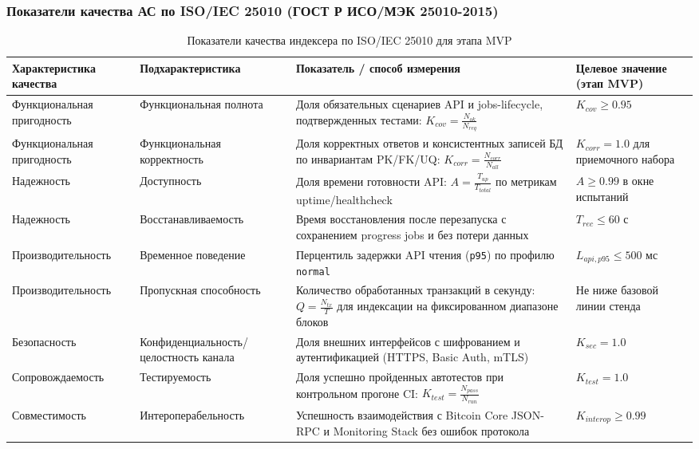 ﻿\documentclass[14pt,a4paper]{extarticle}
\begin{document}
\subsubsection{Показатели качества АС по ISO/IEC 25010 (ГОСТ Р ИСО/МЭК 25010-2015)}
\begin{table}[H]
\centering
\begin{tabular}{p{} p{} p{} p{}}
\toprule
Характеристика качества & Подхарактеристика & Показатель / способ измерения & Целевое значение (этап MVP) \\
\midrule
Функциональная пригодность & Функциональная полнота & Доля обязательных сценариев API и jobs-lifecycle, подтвержденных тестами: $K_{cov}=\frac{N_{ok}}{N_{req}}$ & $K_{cov} \ge 0.95$ \\
\midrule
Функциональная пригодность & Функциональная корректность & Доля корректных ответов и консистентных записей БД по инвариантам PK/FK/UQ: $K_{corr}=\frac{N_{corr}}{N_{all}}$ & $K_{corr}=1.0$ для приемочного набора \\
\midrule
Надежность & Доступность & Доля времени готовности API: $A=\frac{T_{up}}{T_{total}}$ по метрикам uptime/healthcheck & $A \ge 0.99$ в окне испытаний \\
\midrule
Надежность & Восстанавливаемость & Время восстановления после перезапуска с сохранением progress jobs и без потери данных & $T_{rec} \le 60$ с \\
\midrule
Производительность & Временное поведение & Перцентиль задержки API чтения (\texttt{p95}) по профилю \texttt{normal} & $L_{api,p95} \le 500$ мс \\
\midrule
Производительность & Пропускная способность & Количество обработанных транзакций в секунду: $Q=\frac{N_{tx}}{T}$ для индексации на фиксированном диапазоне блоков & Не ниже базовой линии стенда \\
\midrule
Безопасность & Конфиденциальность/целостность канала & Доля внешних интерфейсов с шифрованием и аутентификацией (HTTPS, Basic Auth, mTLS) & $K_{sec}=1.0$ \\
\midrule
Сопровождаемость & Тестируемость & Доля успешно пройденных автотестов при контрольном прогоне CI: $K_{test}=\frac{N_{pass}}{N_{run}}$ & $K_{test}=1.0$ \\
\midrule
Совместимость & Интероперабельность & Успешность взаимодействия с Bitcoin Core JSON-RPC и Monitoring Stack без ошибок протокола & $K_{interop} \ge 0.99$ \\
\bottomrule
\end{tabular}
\caption{Показатели качества индексера по ISO/IEC 25010 для этапа MVP}
\end{table}
\end{document}
